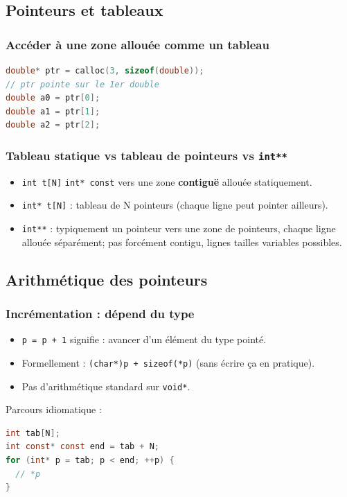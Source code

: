 \subsection{Pointeurs et tableaux}
\subsubsection{Accéder à une zone allouée comme un tableau}
\begin{lstlisting}[language=C]
double* ptr = calloc(3, sizeof(double));
// ptr pointe sur le 1er double
double a0 = ptr[0];
double a1 = ptr[1];
double a2 = ptr[2];
\end{lstlisting}

\subsubsection{Tableau statique vs tableau de pointeurs vs \texttt{int**}}
\begin{itemize}
  \item \texttt{int t[N]} \approx \texttt{int* const} vers une zone \textbf{contiguë} allouée statiquement.
  \item \texttt{int* t[N]} : tableau de N pointeurs (chaque ligne peut pointer ailleurs).
  \item \texttt{int**} : typiquement un pointeur vers une zone de pointeurs, chaque ligne allouée séparément;
        pas forcément contigu, lignes tailles variables possibles.
\end{itemize}

\subsection{Arithmétique des pointeurs}
\subsubsection{Incrémentation : dépend du type}
\begin{itemize}
  \item \texttt{p = p + 1} signifie : avancer d'un élément du type pointé.
  \item Formellement : \texttt{(char*)p + sizeof(*p)} (sans écrire ça en pratique).
  \item Pas d'arithmétique standard sur \texttt{void*}.
\end{itemize}

Parcours idiomatique :
\begin{lstlisting}[language=C]
int tab[N];
int const* const end = tab + N;
for (int* p = tab; p < end; ++p) {
  // *p
}
\end{lstlisting}

